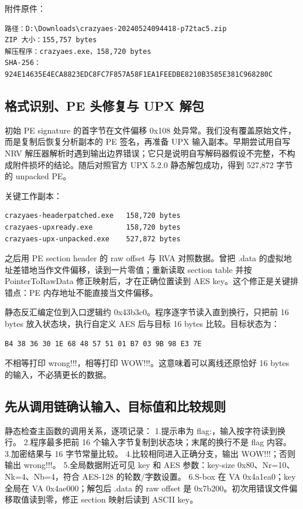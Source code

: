 附件原件：

\begin{verbatim}
路径：D:\Downloads\crazyaes-20240524094418-p72tac5.zip
ZIP 大小：155,757 bytes
解压程序：crazyaes.exe，158,720 bytes
SHA-256：924E14635E4ECA8823EDC8FC7F857A58F1EA1FEEDBE8210B3585E381C968280C
\end{verbatim}

\subsection{格式识别、PE 头修复与 UPX 解包}\label{ux683cux5f0fux8bc6ux522bpe-ux5934ux4feeux590dux4e0e-upx-ux89e3ux5305}

初始 PE signature 的首字节在文件偏移 0x108 处异常。我们没有覆盖原始文件，而是复制后恢复分析副本的 PE 签名，再准备 UPX 输入副本。早期尝试用自写 NRV 解压器解析时遇到输出边界错误；它只是说明自写解码器假设不完整，不构成附件损坏的结论。随后对照官方 UPX 5.2.0 静态解包成功，得到 527,872 字节的 unpacked PE。

关键工作副本：

\begin{verbatim}
crazyaes-headerpatched.exe   158,720 bytes
crazyaes-upxready.exe        158,720 bytes
crazyaes-upx-unpacked.exe    527,872 bytes
\end{verbatim}

之后用 PE section header 的 raw offset 与 RVA 对照数据。曾把 .data 的虚拟地址差错地当作文件偏移，读到一片零值；重新读取 section table 并按 PointerToRawData 修正映射后，才在正确位置读到 AES key。这个修正是关键排错点：PE 内存地址不能直接当文件偏移。

静态反汇编定位到入口逻辑约 0x43b3c0。程序逐字节读入直到换行，只把前 16 bytes 放入状态块，执行自定义 AES 后与目标 16 bytes 比较。目标状态为：

\begin{verbatim}
B4 38 36 30 1E 68 48 57 51 01 B7 03 9B 98 E3 7E
\end{verbatim}

不相等打印 wrong!!!，相等打印 WOW!!!。这意味着可以离线还原恰好 16 bytes 的输入，不必猜更长的数据。

\subsection{先从调用链确认输入、目标值和比较规则}\label{ux5148ux4eceux8c03ux7528ux94feux786eux8ba4ux8f93ux5165ux76eeux6807ux503cux548cux6bd4ux8f83ux89c4ux5219}

静态检查主函数的调用关系，逐项记录： 1.提示串为 flag:，输入按字符读到换行。 2.程序最多把前 16 个输入字节复制到状态块；末尾的换行不是 flag 内容。 3.加密结果与 16 字节常量比较。 4.比较相同进入正确分支，输出 WOW!!!；否则输出 wrong!!!。 5.全局数据附近可见 key 和 AES 参数：key-size 0x80、Nr=10、Nk=4、Nb=4，符合 AES-128 的轮数/字数设置。 6.S-box 在 VA 0x4a1ea0；key 全局在 VA 0x4ae000；解包后 .data 的 raw offset 是 0x7b200。初次用错误文件偏移取值读到零，修正 section 映射后读到 ASCII key。

